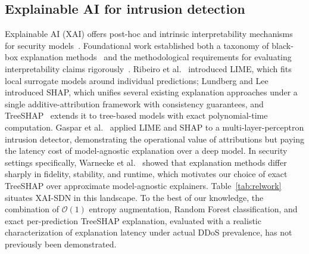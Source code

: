 ﻿\documentclass[review,12pt]{elsarticle}
\begin{document}
\subsection{Explainable AI for intrusion detection}
Explainable AI (XAI) offers post-hoc and intrinsic interpretability mechanisms for security models~\cite{arrieta2020xai}. Foundational work established both a taxonomy of black-box explanation methods~\cite{guidotti2018survey} and the methodological requirements for evaluating interpretability claims rigorously~\cite{doshivelez2017rigorous}. Ribeiro et al.~\cite{ribeiro2016lime} introduced LIME, which fits local surrogate models around individual predictions; Lundberg and Lee~\cite{lundberg2017shap} introduced SHAP, which unifies several existing explanation approaches under a single additive-attribution framework with consistency guarantees, and TreeSHAP~\cite{lundberg2020treeshap} extends it to tree-based models with exact polynomial-time computation. Gaspar et al.~\cite{gaspar2024xai} applied LIME and SHAP to a multi-layer-perceptron intrusion detector, demonstrating the operational value of attributions but paying the latency cost of model-agnostic explanation over a deep model. In security settings specifically, Warnecke et al.~\cite{warnecke2020evaluating} showed that explanation methods differ sharply in fidelity, stability, and runtime, which motivates our choice of exact TreeSHAP over approximate model-agnostic explainers. Table~\ref{tab:relwork} situates XAI-SDN in this landscape. To the best of our knowledge, the combination of $\mathcal{O}(1)$ entropy augmentation, Random Forest classification, and exact per-prediction TreeSHAP explanation, evaluated with a realistic characterization of explanation latency under actual DDoS prevalence, has not previously been demonstrated.
\end{document}
